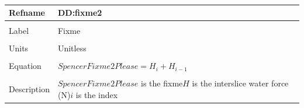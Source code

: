 \documentclass[12pt]{article}
\begin{document}
~\newline
\noindent \begin{minipage}{\textwidth}
\begin{tabular}{p{} p{}}
\toprule \textbf{Refname} & \textbf{DD:fixme2}
\label{DD:fixme2}
\\ \midrule \\
Label & Fixme
\\ \midrule \\
Units & Unitless
\\ \midrule \\
Equation & $SpencerFixme2Please=H_{i}+H_{i-1}$
\\ \midrule \\
Description & $SpencerFixme2Please$ is the fixme\newline$H$ is the interslice water force (N)\newline$i$ is the index
\\ \bottomrule \end{tabular}
\end{minipage}\\
\end{document}
